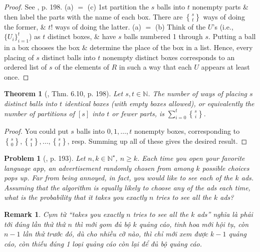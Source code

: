 \documentclass[oneside]{book}
\newtheorem{problem}{Problem}
\newtheorem{remark}{Remark}
\newtheorem{theorem}{Theorem}
\newcommand{\genstirlingII}[3]{%
	\genfrac{\{}{\}}{0pt}{#1}{#2}{#3}%
}
\newcommand{\stirlingII}[2]{\genstirlingII{}{#1}{#2}}
\begin{document}
\begin{proof}
	See \cite{Shahriari2022}, p. 198. (a) $=$ (c) 1st partition the $s$ balls into $t$ nonempty parts \& then label the parts with the name of each box. There are $\stirlingII{s}{t}$ ways of doing the former, \& $t!$ ways of doing the latter. (a) $=$ (b) Think of the $U$'s (i.e., $\{U_i\}_{i=1}^t$) as $t$ distinct boxes, \& have $s$ balls numbered 1 through $s$. Putting a ball in a box chooses the box \& determine the place of the box in a list. Hence, every placing of $s$ distinct balls into $t$ nonempty distinct boxes corresponds to an ordered list of $s$ of the elements of $R$ in such a way that each $U$ appears at least once.
\end{proof}

\begin{theorem}[\cite{Shahriari2022}, Thm. 6.10, p. 198]
	Let $s,t\in\mathbb{N}$. The number of ways of placing $s$ distinct balls into $t$ identical boxes (with empty boxes allowed), or equivalently the number of partitions of $[s]$ into $t$ or fewer parts, is $\sum_{i=0}^t \stirlingII{s}{i}$.
\end{theorem}

\begin{proof}
	You could put $s$ balls into $0,1,\ldots,t$ nonempty boxes, corresponding to $\stirlingII{s}{0},\stirlingII{s}{1},\ldots,\stirlingII{s}{t}$, resp. Summing up all of these gives the desired result.
\end{proof}

\begin{problem}[\cite{Shahriari2022}, p. 193]
	Let $n,k\in\mathbb{N}^\star$, $n\ge k$. Each time you open your favorite language app, an advertisement randomly chosen from among $k$ possible choices pops up. Far from being annoyed, in fact, you would like to see each of the $k$ ads. Assuming that the algorithm is equally likely to choose any of the ads each time, what is the probability that it takes you exactly $n$ tries to see all the $k$ ads?
\end{problem}

\begin{remark}
	Cụm từ ``takes you exactly $n$ tries to see all the $k$ ads'' nghĩa là phải tới đúng lần thử thứ $n$ thì mới gom đủ bộ $k$ quảng cáo, tinh hoa mới hội tụ, còn $n - 1$ lần thử trước đó, dù cho nhiều cỡ nào, thì chỉ mới xem được $k - 1$ quảng cáo, còn thiếu đúng 1 loại quảng cáo còn lại để đủ bộ quảng cáo.
\end{remark}
\end{document}
